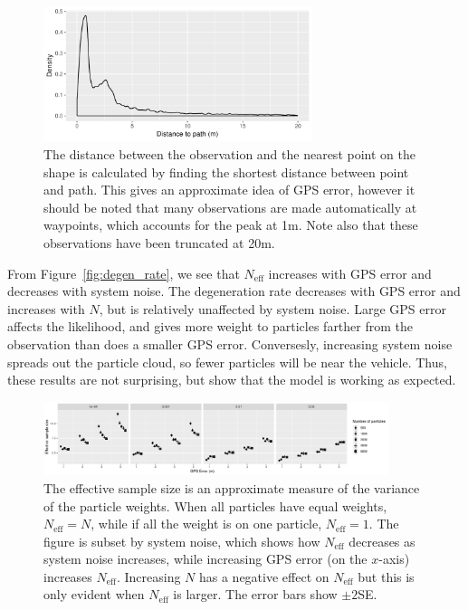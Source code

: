 \begin{figure}[tb]
    \centering
    \includegraphics[width=0.7\textwidth]{figures/04_model_results_dist.pdf}
    \caption{
        The distance between the observation and the nearest point on the shape
        is calculated by finding the shortest distance between point and path.
        This gives an approximate idea of GPS error, however it should be noted
        that many observations are made automatically at waypoints,
        which accounts for the peak at 1m.
        Note also that these observations have been truncated at 20m.
    }
    \label{fig:dist_to_route}
\end{figure}


From Figure~\ref{fig:degen_rate}, we see that $N_\text{eff}$ increases
with GPS error and decreases with system noise.
The degeneration rate decreases with GPS error and increases with $N$,
but is relatively unaffected by system noise.
Large GPS error affects the likelihood,
and gives more weight to particles farther from the observation
than does a smaller GPS error.
Conversesly, increasing system noise spreads out the particle cloud,
so fewer particles will be near the vehicle.
Thus, these results are not surprising, 
but show that the model is working as expected.


\begin{figure}[tb]
    \centering
    \includegraphics[width=0.9\textwidth]{figures/04_model_results_neff.pdf}
    \caption{
        The effective sample size is an approximate measure of the variance
        of the particle weights.
        When all particles have equal weights, $N_\text{eff} = N$,
        while if all the weight is on one particle, $N_\text{eff} = 1$. 
        The figure is subset by system noise, which shows how $N_\text{eff}$ 
        decreases as system noise increases,
        while increasing GPS error (on the $x$-axis) increases $N_\text{eff}$.
        Increasing $N$ has a negative effect on $N_\text{eff}$ but this is
        only evident when $N_\text{eff}$ is larger.
        The error bars show $\pm 2$SE.
    }
    \label{fig:neff}
\end{figure}


